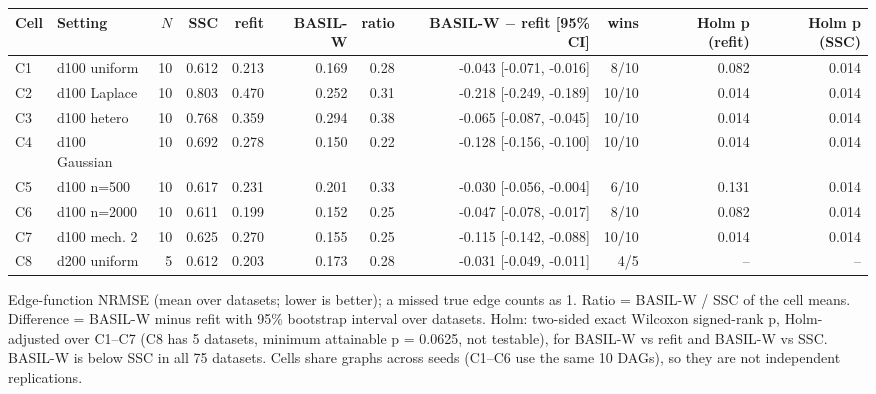 \begin{adjustbox}{max width=\textwidth}
\begin{tabular}{llrrrrrrrrr}
\toprule
Cell & Setting & $N$ & SSC & refit & BASIL-W & ratio & BASIL-W $-$ refit [95\% CI] & wins & Holm p (refit) & Holm p (SSC) \\
\midrule
C1 & d100 uniform & 10 & 0.612 & 0.213 & 0.169 & 0.28 & -0.043 [-0.071, -0.016] & 8/10 & 0.082 & 0.014 \\
C2 & d100 Laplace & 10 & 0.803 & 0.470 & 0.252 & 0.31 & -0.218 [-0.249, -0.189] & 10/10 & 0.014 & 0.014 \\
C3 & d100 hetero & 10 & 0.768 & 0.359 & 0.294 & 0.38 & -0.065 [-0.087, -0.045] & 10/10 & 0.014 & 0.014 \\
C4 & d100 Gaussian & 10 & 0.692 & 0.278 & 0.150 & 0.22 & -0.128 [-0.156, -0.100] & 10/10 & 0.014 & 0.014 \\
C5 & d100 n=500 & 10 & 0.617 & 0.231 & 0.201 & 0.33 & -0.030 [-0.056, -0.004] & 6/10 & 0.131 & 0.014 \\
C6 & d100 n=2000 & 10 & 0.611 & 0.199 & 0.152 & 0.25 & -0.047 [-0.078, -0.017] & 8/10 & 0.082 & 0.014 \\
C7 & d100 mech. 2 & 10 & 0.625 & 0.270 & 0.155 & 0.25 & -0.115 [-0.142, -0.088] & 10/10 & 0.014 & 0.014 \\
C8 & d200 uniform & 5 & 0.612 & 0.203 & 0.173 & 0.28 & -0.031 [-0.049, -0.011] & 4/5 & -- & -- \\
\bottomrule
\end{tabular}
\end{adjustbox}

\smallskip
{\footnotesize Edge-function NRMSE (mean over datasets; lower is better); a missed true edge counts as 1. Ratio = BASIL-W / SSC of the cell means. Difference = BASIL-W minus refit with 95\% bootstrap interval over datasets. Holm: two-sided exact Wilcoxon signed-rank p, Holm-adjusted over C1--C7 (C8 has 5 datasets, minimum attainable p = 0.0625, not testable), for BASIL-W vs refit and BASIL-W vs SSC. BASIL-W is below SSC in all 75 datasets. Cells share graphs across seeds (C1--C6 use the same 10 DAGs), so they are not independent replications.}
